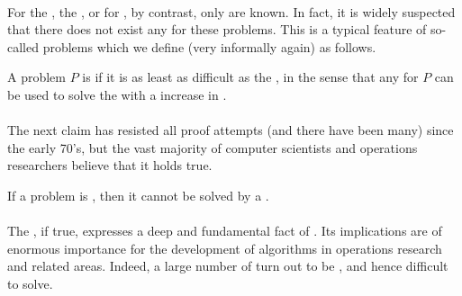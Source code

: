 \paragraph{}
For the , the , or for , by contrast, only  are known. In fact, it is widely suspected that there does not exist any  for these problems. This is a typical feature of so-called  problems which we define (very informally again) as follows.

\begin{definition}[NP-hard]
A problem $P$ is  if it is as least as difficult as the , in the sense that any  for $P$ can be used to solve the  with a  increase in .
\end{definition}

\paragraph{}
The next claim has resisted all proof attempts (and there have been many) since the early 70's, but the vast majority of computer scientists and operations researchers believe that it holds true.

\begin{conjecture}[$P\neq NP$]
If a problem is , then it cannot be solved by a .
\end{conjecture}

\paragraph{}
The , if true, expresses a deep and fundamental fact of . Its implications are of enormous importance for the development of algorithms in operations research and related areas. Indeed, a large number of  turn out to be , and hence difficult to solve.

